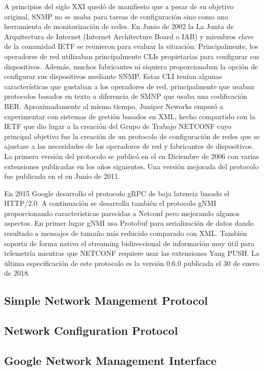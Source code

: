 A principios del siglo XXI quedó de manifiesto que a pesar de su objetivo original, SNMP no se usaba para
tareas de configuración sino como una herramienta de monitorización de redes. En Junio de 2002 la La Junta
de Arquitectura de Internet (Internet Architecture Board o IAB) y miembros clave de la comunidad \gls{IETF}
se reunieron para evaluar la situación. Principalmente, los operadores de red utilizaban principalmente \glspl{CLI} propietarias para configurar sus
dispositivos. Además, muchos fabricantes ni siquiera proporcionaban la opción de configurar sus dispositivos
mediante SNMP. Estas \gls{CLI} tenían algunas características que gustaban a los operadores de red,
principalmente que usaban protocolos basados en texto a diferencia de SMNP que usaba una codificación BER.
Aproximadamente al mismo tiempo, Juniper Neworks empezó a experimentar con sistemas de gestión basados en
\gls{XML}, hecho compartido con la \gls{IETF} que dio lugar a la creación del Grupo de Trabajo NETCONF cuyo
principal objetivo fue la creación de un protocolo de configuración de redes que se ajustase a las necesidades
de los operadores de red y fabricantes de dispositivos. La primera versión del protocolo se publicó en el
 en Diciembre de 2006 con varias extensiones publicadas en los años siguientes. Una versión
mejorada del protocolo fue publicada en el  en Junio de 2011.

En 2015 Google desarrollo el protocolo \gls{gRPC} de baja latencia basado el \gls{HTTP}/2.0. A continuación 
se desarrolla también el protocolo \gls{gNMI} proporcionando características parecidas a Netconf pero 
mejorando algunos aspectos. En primer lugar \gls{gNMI} usa Protobuf para serialización de datos dando resultado 
a mensajes de tamaño más reducido comparado con \gls{XML}. También soporta de forma nativa el streaming 
bidireccional de información muy útil para telemetría mientras que \gls{NETCONF} requiere usar las extensiones 
Yang PUSH. La última especificación de este protocolo es la versión 0.6.0 publicada el 30 de enero de 2018. 

\subsection{Simple Network Mangement Protocol\label{sec:SNMP}}


\subsection{Network Configuration Protocol\label{sec:NETCONF}}


\subsection{Google Network Management Interface\label{sec:gNMI}}
